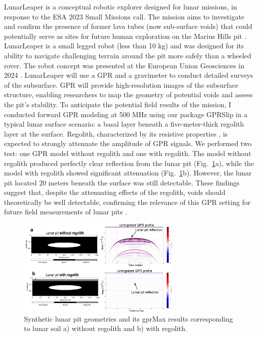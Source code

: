 LunarLeaper is a conceptual robotic explorer designed for lunar missions, in response to the ESA 2023 Small Missions call. The mission aims to investigate and confirm the presence of former lava tubes (now sub-surface voids) that could potentially serve as sites for future human exploration on the Marius Hills pit \citep{Wagner&al2014,Sauro&al2020}. LunarLeaper is a small legged robot (less than 10 kg) and was designed for its ability to navigate challenging terrain around the pit more safely than a wheeled rover. The robot concept was presented at the European Union Geosciences in 2024 \citep{Mittelholz&al2024}. LunarLeaper will use a GPR and a gravimeter to conduct detailed surveys of the subsurface. GPR will provide high-resolution images of the subsurface structure, enabling researchers to map the geometry of potential voids and assess the pit's stability. To anticipate the potential field results of the mission, I conducted forward GPR modeling at 500 MHz using our package GPRSlip in a typical lunar surface scenario: a basal layer beneath a five-meter-thick regolith layer at the surface. Regolith, characterized by its resistive properties \citep{Ding&al2022}, is expected to strongly attenuate the amplitude of GPR signals. We performed two test: one GPR model without regolith and one with regolith. The model without regolith produced perfectly clear reflection from the lunar pit (Fig.~\ref{fig:lunar_pit}a), while the model with regolith showed significant attenuation (Fig.~\ref{fig:lunar_pit}b). However, the lunar pit located 20 meters beneath the surface was still detectable. These findings suggest that, despite the attenuating effects of the regolith, voids should theoretically be well detectable, confirming the relevance of this GPR setting for future field measurements of lunar pits \citep{Mittelholz&al2024}.

\begin{figure}[h]
    \centering
    \includegraphics[width=0.7\textwidth]{chapters/Discussion/lunar_pit.pdf}
    \caption{Synthetic lunar pit geometries and its gprMax results corresponding to lunar soil a) without regolith and b) with regolith.}
    \label{fig:lunar_pit}
\end{figure}


